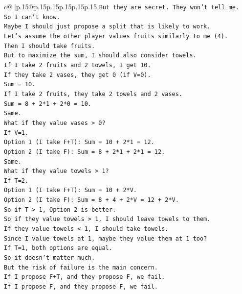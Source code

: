 \documentclass{article}
\begin{document}
{\begin{supertabular}{c@{$\;$}|p{.15\linewidth}@{}p{.15\linewidth}p{.15\linewidth}p{.15\linewidth}p{.15\linewidth}p{.15\linewidth}}
{{{\texttt{But they are secret. They won't tell me.} \\
\texttt{So I can't know.} \\
\texttt{Maybe I should just propose a split that is likely to work.} \\
\texttt{Let's assume the other player values fruits similarly to me (4).} \\
\texttt{Then I should take fruits.} \\
\texttt{But to maximize the sum, I should also consider towels.} \\
\texttt{If I take 2 fruits and 2 towels, I get 10.} \\
\texttt{If they take 2 vases, they get 0 (if V=0).} \\
\texttt{Sum = 10.} \\
\texttt{If I take 2 fruits, they take 2 towels and 2 vases.} \\
\texttt{Sum = 8 + 2*1 + 2*0 = 10.} \\
\texttt{Same.} \\
\texttt{What if they value vases > 0?} \\
\texttt{If V=1.} \\
\texttt{Option 1 (I take F+T): Sum = 10 + 2*1 = 12.} \\
\texttt{Option 2 (I take F): Sum = 8 + 2*1 + 2*1 = 12.} \\
\texttt{Same.} \\
\texttt{What if they value towels > 1?} \\
\texttt{If T=2.} \\
\texttt{Option 1 (I take F+T): Sum = 10 + 2*V.} \\
\texttt{Option 2 (I take F): Sum = 8 + 4 + 2*V = 12 + 2*V.} \\
\texttt{So if T > 1, Option 2 is better.} \\
\texttt{So if they value towels > 1, I should leave towels to them.} \\
\texttt{If they value towels < 1, I should take towels.} \\
\texttt{Since I value towels at 1, maybe they value them at 1 too?} \\
\texttt{If T=1, both options are equal.} \\
\texttt{So it doesn't matter much.} \\
\texttt{But the risk of failure is the main concern.} \\
\texttt{If I propose F+T, and they propose F, we fail.} \\
\texttt{If I propose F, and they propose F, we fail.} \\
}}}
\end{supertabular}}
\end{document}
